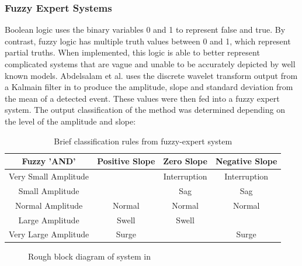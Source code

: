\documentclass[12pt]{article}
\begin{document}
{\subsubsection{Fuzzy Expert Systems}
Boolean logic uses the binary variables 0 and 1 to represent false and true. By contrast, fuzzy logic has multiple truth values between 0 and 1, which represent partial truths. When implemented, this logic is able to better represent complicated systems that are vague and unable to be accurately depicted by well known models.
Abdelsalam et al. uses the discrete wavelet transform output from a Kalmain filter in \cite{KF} to produce the amplitude, slope and standard deviation from the mean of a detected event. These values were then fed into a fuzzy expert system. The output classification of the method was determined depending on the level of the amplitude and slope:
\begin{table}[H]
\centering
\begin{tabular}{|c|c|c|c|}
\hline
Fuzzy 'AND' & Positive Slope & Zero Slope & Negative Slope\\
\hline
Very Small Amplitude & & Interruption & Interruption\\
\hline
Small Amplitude & &Sag &Sag \\
\hline
Normal Amplitude & Normal& Normal &Normal\\
\hline
Large Amplitude &Swell & Swell &\\
\hline
Very Large Amplitude &Surge & &Surge\\
\hline
\end{tabular}
\caption{Brief classification rules from fuzzy-expert system}
\end{table}

\begin{figure}[H]
\centering
{}
\caption{Rough block diagram of system in \cite{KF}}
\end{figure}

}
\end{document}
